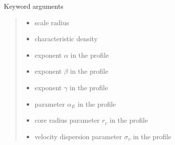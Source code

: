 \documentclass[letterpaper,10pt,english]{sphinxmanual}
\begin{document}
\begin{fulllineitems}
\begin{quote}
\begin{description}
\end{description}\end{quote}

\sphinxAtStartPar
Keyword arguments
\begin{quote}\begin{description}
\begin{itemize}
\item {} 
\sphinxAtStartPar
{} \textendash{} scale radius

\item {} 
\sphinxAtStartPar
{} \textendash{} characteristic density

\item {} 
\sphinxAtStartPar
{} \textendash{} exponent \(\alpha\) in the {\hyperref[\detokenize{diffsph.profiles:diffsph.profiles.templates.hdz}]{}} profile

\item {} 
\sphinxAtStartPar
{} \textendash{} exponent \(\beta\) in the {\hyperref[\detokenize{diffsph.profiles:diffsph.profiles.templates.hdz}]{}} profile

\item {} 
\sphinxAtStartPar
{} \textendash{} exponent \(\gamma\) in the {\hyperref[\detokenize{diffsph.profiles:diffsph.profiles.templates.hdz}]{}} profile

\item {} 
\sphinxAtStartPar
{} \textendash{} parameter \(\alpha_E\) in the {\hyperref[\detokenize{diffsph.profiles:diffsph.profiles.templates.enst}]{}} profile

\item {} 
\sphinxAtStartPar
{} \textendash{} core radius parameter \(r_c\) in the {\hyperref[\detokenize{diffsph.profiles:diffsph.profiles.templates.cnfw}]{}} profile

\item {} 
\sphinxAtStartPar
{} \textendash{} velocity dispersion parameter \(\sigma_v\) in the {\hyperref[\detokenize{diffsph.profiles:diffsph.profiles.templates.sis}]{}} profile


\end{itemize}
\end{description}
\end{quote}
\end{fulllineitems}
\end{document}

